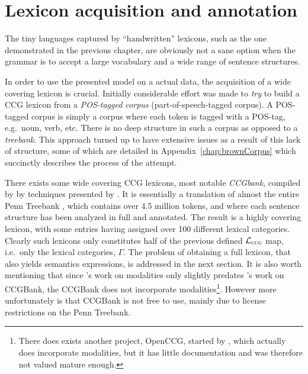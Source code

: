 
\chapter{Lexicon acquisition and annotation}
\label{chap:lexiconAcquisition}
The tiny languages captured by ``handwritten'' lexicons, such as the one demonstrated in the previous chapter, are obviously not a sane option when the grammar is to accept a large vocabulary and a wide range of sentence structures.

In order to use the presented model on a actual data, the acquisition of a wide covering lexicon is crucial. Initially considerable effort was made to \emph{try} to build a CCG lexicon from a \emph{POS-tagged corpus} (part-of-speech-tagged corpus). A POS-tagged corpus is simply a corpus where each token is tagged with a POS-tag, e.g.\ noun, verb, etc. There is no deep structure in such a corpus as opposed to a \emph{treebank}. This approach turned up to have extensive issues as a result of this lack of structure, some of which are detailed in Appendix~\ref{chap:brownCorpus} which succinctly describes the process of the attempt.

There exists some wide covering CCG lexicons, most notable \emph{CCGbank}, compiled by \citeauthor{ccgBank}  by techniques presented by \cite{juliaThesis}. It is essentially a translation of almost the entire Penn Treebank \cite{pennTreebank}, which contains over 4.5 million tokens, and where each sentence structure has been analyzed in full and annotated. The result is a highly covering lexicon, with some entries having assigned over 100 different lexical categories. Clearly such lexicons only constitutes half of the previous defined $\mathcal{L}_\textsc{ccg}$ map, i.e.\ only the lexical categories, $\Gamma$. The problem of obtaining a full lexicon, that also yields semantics expressions, is addressed in the next section. It is also worth mentioning that since \citeauthor{baldridgeThesis}'s  work on modalities only slightly predates \citeauthor{juliaThesis}'s  work on CCGBank, the CCGBank does not incorporate modalities\footnote{There does exists another project, OpenCCG, started by \citeauthor{baldridgeThesis}, which actually does incorporate modalities, but it has little documentation and was therefore not valued mature enough.}. However more unfortunately is that CCGBank is not free to use, mainly due to license restrictions on the Penn Treebank.%

